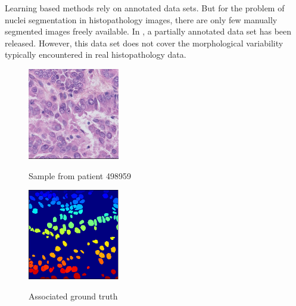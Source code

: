 \documentclass{article}
\begin{document}
Learning based methods rely on annotated data sets. But for the
problem of nuclei segmentation in histopathology images, there are
only few manually segmented images freely available. 
In \cite{Drelie08-298}, a partially annotated data set has been
released. However, this data set does not cover the morphological
variability typically encountered in real histopathology data. 

\begin{figure}[htb]
\begin{minipage}[b]{.48\linewidth}
  \centering
  \centerline{\includegraphics[width=4.0cm]{RGB_1}}
  \centerline{Sample from patient 498959}\medskip
\end{minipage}
\hfill
\begin{minipage}[b]{0.48\linewidth}
  \centering
  \centerline{\includegraphics[width=4.0cm]{GT_1}}
  \centerline{Associated ground truth}\medskip
\end{minipage}
%
%
%
%
\begin{minipage}[b]{.48\linewidth}

\end{minipage}
\end{figure}
\end{document}
